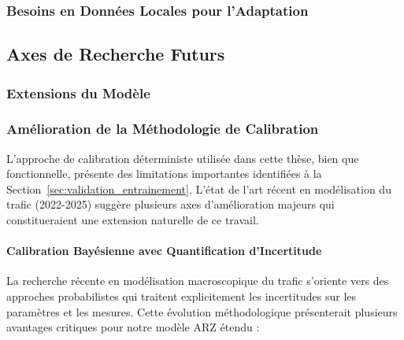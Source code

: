 \subsubsection{Besoins en Données Locales pour l'Adaptation}

\subsection{Axes de Recherche Futurs}
\subsubsection{Extensions du Modèle}

\subsubsection{Amélioration de la Méthodologie de Calibration}
\label{subsec:amelioration_calibration}

L'approche de calibration déterministe utilisée dans cette thèse, bien que fonctionnelle, présente des limitations importantes identifiées à la Section~\ref{sec:validation_entrainement}. L'état de l'art récent en modélisation du trafic (2022-2025) suggère plusieurs axes d'amélioration majeurs qui constitueraient une extension naturelle de ce travail.

\paragraph{Calibration Bayésienne avec Quantification d'Incertitude}
La recherche récente en modélisation macroscopique du trafic s'oriente vers des approches probabilistes qui traitent explicitement les incertitudes sur les paramètres et les mesures. Cette évolution méthodologique présenterait plusieurs avantages critiques pour notre modèle ARZ étendu :

